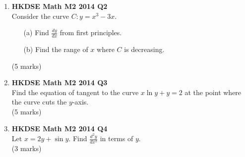 \documentclass{report}
\begin{document}
\begin{enumerate}
	\item \textbf{HKDSE Math M2 2014 Q2}\\
	Consider the curve $C : y = x^3-3x$. 
	\begin{enumerate}
		\item [(a)]Find $\displaystyle\frac{dy}{dx}$ from  first principles. 
		\item [(b)]Find the range of $x$ where $C$ is decreasing.
	\end{enumerate}
	(5 marks)

	\item \textbf{HKDSE Math M2 2014 Q3}\\
	Find the equation of tangent to the curve $x\ln{y} + y = 2$ at the point where the curve cuts the $y$-axis.\\(5 marks)

	\item \textbf{HKDSE Math M2 2014 Q4}\\
	Let $x = 2y + \sin{y}$. Find $\displaystyle\frac{d^2y}{dx^2}$ in terms of $y$.\\(3 marks)

	\newpage


\end{enumerate}
\end{document}
